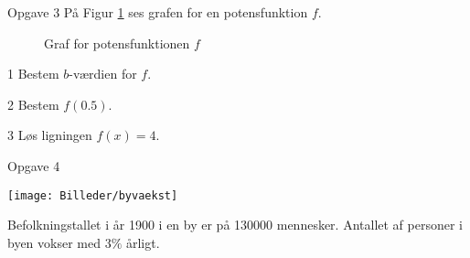\newpage
\begin{opgavetekst}{Opgave 3}
	På Figur \ref{fig:potensgraf} ses grafen for en potensfunktion $f$.
	\begin{figure}[H]
		\centering
		\caption{Graf for potensfunktionen $f$}
		\label{fig:potensgraf}
	\end{figure}
	\phantom{h}
\end{opgavetekst}
\begin{delopgave}{}{1}
	Bestem $b$-værdien for $f$.
\end{delopgave}
\begin{delopgave}{}{2}
	Bestem $f(0.5)$.
\end{delopgave}
\begin{delopgave}{}{3}
	Løs ligningen $f(x) = 4$.
\end{delopgave}
\newpage
\begin{opgavetekst}{Opgave 4}
	\begin{center}
		\texttt{[image: Billeder/byvaekst]}
	\end{center}
	Befolkningstallet i år 1900 i en by er på 130000 mennesker. Antallet af personer i byen vokser med 3$\%$ årligt.
\end{opgavetekst}
